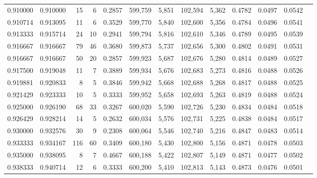 \begin{tabular}{rrrrrrrrrrrrr}
0.910000 & 0.910000 &     15 &      6 &                                     0.2857 & 599,759 &   5,851 & 102,594 &   5,362 & 0.4782 & 0.0497 & 0.0542 \\
0.910714 & 0.913095 &     11 &      6 &                                     0.3529 & 599,770 &   5,840 & 102,600 &   5,356 & 0.4784 & 0.0496 & 0.0541 \\
0.913333 & 0.915714 &     24 &     10 &                                     0.2941 & 599,794 &   5,816 & 102,610 &   5,346 & 0.4789 & 0.0495 & 0.0539 \\
0.916667 & 0.916667 &     79 &     46 &                                     0.3680 & 599,873 &   5,737 & 102,656 &   5,300 & 0.4802 & 0.0491 & 0.0531 \\
0.916667 & 0.916667 &     50 &     20 &                                     0.2857 & 599,923 &   5,687 & 102,676 &   5,280 & 0.4814 & 0.0489 & 0.0527 \\
0.917500 & 0.919048 &     11 &      7 &                                     0.3889 & 599,934 &   5,676 & 102,683 &   5,273 & 0.4816 & 0.0488 & 0.0526 \\
0.919881 & 0.920833 &      8 &      5 &                                     0.3846 & 599,942 &   5,668 & 102,688 &   5,268 & 0.4817 & 0.0488 & 0.0525 \\
0.921429 & 0.923333 &     10 &      5 &                                     0.3333 & 599,952 &   5,658 & 102,693 &   5,263 & 0.4819 & 0.0488 & 0.0524 \\
0.925000 & 0.926190 &     68 &     33 &                                     0.3267 & 600,020 &   5,590 & 102,726 &   5,230 & 0.4834 & 0.0484 & 0.0518 \\
0.926429 & 0.928214 &     14 &      5 &                                     0.2632 & 600,034 &   5,576 & 102,731 &   5,225 & 0.4838 & 0.0484 & 0.0517 \\
0.930000 & 0.932576 &     30 &      9 &                                     0.2308 & 600,064 &   5,546 & 102,740 &   5,216 & 0.4847 & 0.0483 & 0.0514 \\
0.933333 & 0.934167 &    116 &     60 &                                     0.3409 & 600,180 &   5,430 & 102,800 &   5,156 & 0.4871 & 0.0478 & 0.0503 \\
0.935000 & 0.938095 &      8 &      7 &                                     0.4667 & 600,188 &   5,422 & 102,807 &   5,149 & 0.4871 & 0.0477 & 0.0502 \\
0.938333 & 0.940714 &     12 &      6 &                                     0.3333 & 600,200 &   5,410 & 102,813 &   5,143 & 0.4873 & 0.0476 & 0.0501 \\

\end{tabular}
